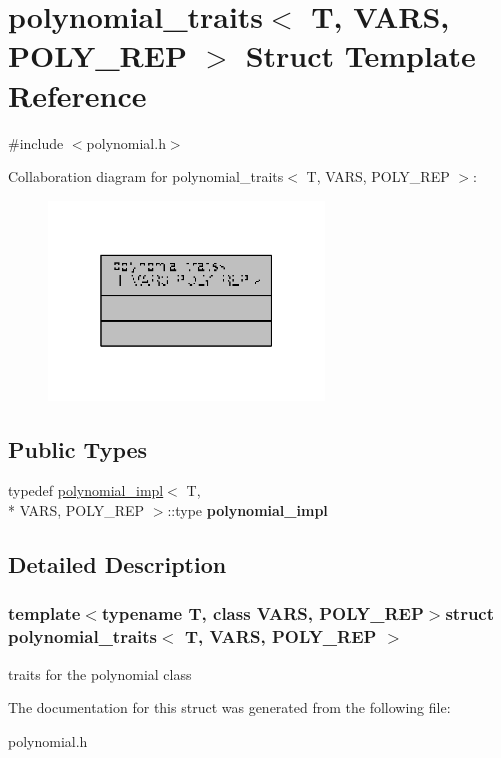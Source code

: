 \hypertarget{structpolynomial__traits}{\section{polynomial\-\_\-traits$<$ T, V\-A\-R\-S, P\-O\-L\-Y\-\_\-\-R\-E\-P $>$ Struct Template Reference}
\label{structpolynomial__traits}
}


{\ttfamily \#include $<$polynomial.\-h$>$}



Collaboration diagram for polynomial\-\_\-traits$<$ T, V\-A\-R\-S, P\-O\-L\-Y\-\_\-\-R\-E\-P $>$\-:
\nopagebreak
\begin{figure}[H]
\begin{center}
\leavevmode
\includegraphics[width=208pt]{structpolynomial__traits__coll__graph}
\end{center}
\end{figure}
\subsection*{Public Types}
\begin{DoxyCompactItemize}
\item 
\hypertarget{structpolynomial__traits_a4b333428fea1558adf753729f9ef91f4}{typedef \hyperlink{structpolynomial__impl}{polynomial\-\_\-impl}$<$ T, \\*
V\-A\-R\-S, P\-O\-L\-Y\-\_\-\-R\-E\-P $>$\-::type {\bfseries polynomial\-\_\-impl}}\label{structpolynomial__traits_a4b333428fea1558adf753729f9ef91f4}

\end{DoxyCompactItemize}


\subsection{Detailed Description}
\subsubsection*{template$<$typename T, class V\-A\-R\-S, P\-O\-L\-Y\-\_\-\-R\-E\-P$>$struct polynomial\-\_\-traits$<$ T, V\-A\-R\-S, P\-O\-L\-Y\-\_\-\-R\-E\-P $>$}

traits for the polynomial class 

The documentation for this struct was generated from the following file\-:\begin{DoxyCompactItemize}
\item 
polynomial.\-h\end{DoxyCompactItemize}
